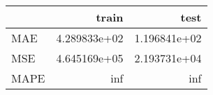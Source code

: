 \begin{tabular}{lrr}
\toprule
{} &         train &          test \\
\midrule
MAE  &  4.289833e+02 &  1.196841e+02 \\
MSE  &  4.645169e+05 &  2.193731e+04 \\
MAPE &           inf &           inf \\
\bottomrule
\end{tabular}
